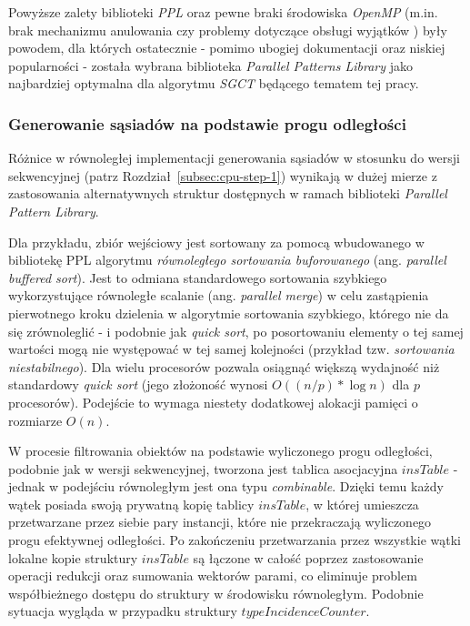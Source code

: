 \documentclass[12pt]{article}
\begin{document}
Powyższe zalety biblioteki \textit{PPL} oraz pewne braki środowiska \textit{OpenMP} (m.in. brak mechanizmu anulowania czy problemy dotyczące obsługi wyjątków \cite{stak}) były powodem, dla których ostatecznie - pomimo ubogiej dokumentacji oraz niskiej popularności -  została wybrana biblioteka \textit{Parallel Patterns Library} jako najbardziej optymalna dla algorytmu \textit{SGCT} będącego tematem tej pracy.

\subsubsection{Generowanie sąsiadów na podstawie progu odległości}

Różnice w równoległej implementacji generowania sąsiadów w stosunku do wersji sekwencyjnej (patrz Rozdział~\ref{subsec:cpu-step-1}) wynikają w dużej mierze z zastosowania alternatywnych struktur dostępnych w ramach biblioteki \textit{Parallel Pattern Library}. 

Dla przykładu, zbiór wejściowy jest sortowany za pomocą wbudowanego w bibliotekę PPL algorytmu \textit{równoległego sortowania buforowanego} (ang. \textit{parallel buffered sort}). Jest to odmiana standardowego sortowania szybkiego wykorzystujące równoległe scalanie (ang. \textit{parallel merge}) w celu zastąpienia pierwotnego kroku dzielenia w algorytmie sortowania szybkiego, którego nie da się zrównoleglić \cite{buffered-sort} - i podobnie jak \textit{quick sort}, po posortowaniu elementy o tej samej wartości mogą nie występować w tej samej kolejności (przykład tzw. \textit{sortowania niestabilnego}). Dla wielu procesorów pozwala osiągnąć większą wydajność niż standardowy \textit{quick sort} (jego złożoność wynosi $ O((n/p)*\log{n}) $ dla $ p $ procesorów). Podejście to wymaga niestety dodatkowej alokacji pamięci o rozmiarze $ O(n) $. 

W procesie filtrowania obiektów na podstawie wyliczonego progu odległości, podobnie jak w wersji sekwencyjnej, tworzona jest tablica asocjacyjna $ insTable $ -  jednak w podejściu równoległym jest ona typu \textit{combinable}. Dzięki temu każdy wątek posiada swoją prywatną kopię tablicy $ insTable $, w której umieszcza przetwarzane przez siebie pary instancji, które nie przekraczają wyliczonego progu efektywnej odległości. Po zakończeniu przetwarzania przez wszystkie wątki lokalne kopie struktury $ insTable $ są łączone w całość poprzez zastosowanie operacji redukcji oraz sumowania wektorów parami, co eliminuje problem współbieżnego dostępu do struktury w środowisku równoległym. Podobnie sytuacja wygląda w przypadku struktury $ typeIncidenceCounter $.
\end{document}

